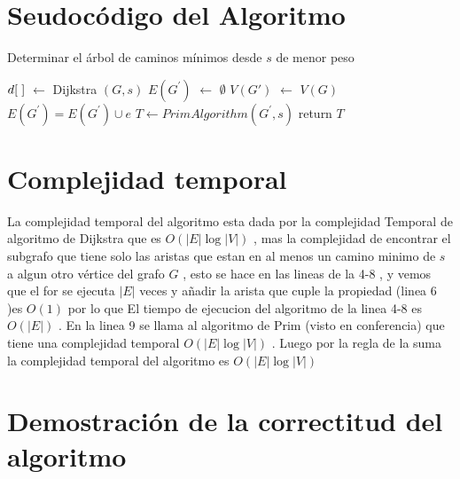 \documentclass{article}
\begin{document}
    \section{Seudoc\'odigo del Algoritmo }

    \begin{algorithm}[H]
        \caption{Determinar el \'arbol de caminos m\'inimos desde $s$ de menor peso }
        \begin{algorithmic}[1] 
            \State $d[\hspace*{0.1cm}]$ $\leftarrow $ Dijkstra $\left(G,s\right)$   
            \State $E (G^{'})$ $\leftarrow$ $\emptyset$
            \State $V(G')$ $\leftarrow$ $V(G)$
                    \State $E(G^{'}) = E(G^{'})  \cup  e $ 
                \EndIf
            \EndFor
            \State $T \leftarrow  PrimAlgorithm (G^{'} , s)$
            \State return $T$ 
        \end{algorithmic}
    \end{algorithm}
    
    \section{Complejidad temporal}

    \noindent La complejidad temporal del algoritmo esta dada por la complejidad Temporal de algoritmo de Dijkstra 
    que es $O(|E|\log |V|)$ , mas la complejidad de encontrar el subgrafo que tiene solo las aristas que estan en al menos 
    un camino minimo de $s$ a algun otro v\'ertice del grafo $G$ , esto se hace en las lineas de la 4-8 , y vemos que el for se 
    ejecuta $|E|$ veces  y a\~nadir la arista que cuple la propiedad (linea 6 )es $O(1)$ por lo que El tiempo de ejecucion del algoritmo 
    de la linea 4-8 es $O(|E|)$ . En la linea 9 se llama al algoritmo de Prim (visto en conferencia) que tiene una complejidad temporal
    $O(|E|\log |V|)$ . Luego por la regla de la suma la complejidad temporal del algoritmo es  $O(|E|\log |V|)$

    \section{Demostraci\'on  de la correctitud del algoritmo}
\end{document}
